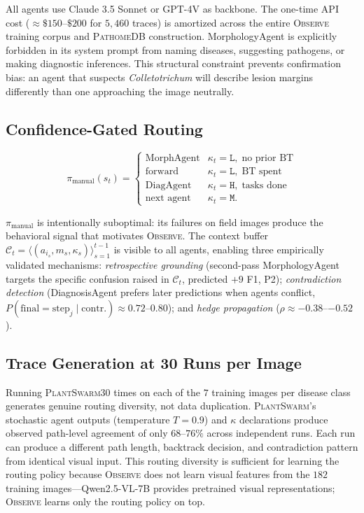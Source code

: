 \documentclass[11pt,twocolumn]{article}
\newcommand{\observe}{\textsc{Observe}\xspace}
\newcommand{\plantswarm}{\textsc{PlantSwarm}\xspace}
\newcommand{\pathomedb}{\textsc{PathomeDB}\xspace}
\newcommand{\kH}{\texttt{H}\xspace}
\newcommand{\kM}{\texttt{M}\xspace}
\newcommand{\kL}{\texttt{L}\xspace}
\begin{document}
All agents use Claude 3.5 Sonnet or GPT-4V as
backbone. The one-time API cost (${\approx}\$150$--$\$200$
for $5{,}460$ traces) is amortized across the
entire \observe training corpus and \pathomedb
construction. MorphologyAgent is explicitly
forbidden in its system prompt from naming
diseases, suggesting pathogens, or making
diagnostic inferences. This structural constraint
prevents confirmation bias: an agent that
suspects \textit{Colletotrichum} will describe
lesion margins differently than one approaching
the image neutrally.

\subsection{Confidence-Gated Routing}

\begin{equation}
\pi_\text{manual}(s_t)=\begin{cases}
\text{MorphAgent} & \kappa_t{=}\kL,\;\text{no prior BT}\\
\text{forward}    & \kappa_t{=}\kL,\;\text{BT spent}\\
\text{DiagAgent}  & \kappa_t{=}\kH,\;\text{tasks done}\\
\text{next agent} & \kappa_t{=}\kM.
\end{cases}
\end{equation}

$\pi_\text{manual}$ is intentionally suboptimal:
its failures on field images produce the behavioral
signal that motivates \observe. The context buffer
$\mathcal{C}_t{=}\langle(a_{i_s}, m_s,
\kappa_s)\rangle_{s=1}^{t-1}$ is visible to all
agents, enabling three empirically validated
mechanisms: \textit{retrospective grounding}
(second-pass MorphologyAgent targets the specific
confusion raised in $\mathcal{C}_t$, predicted
$+9$ F1, P2); \textit{contradiction detection}
(DiagnosisAgent prefers later predictions when
agents conflict, $P(\text{final}{=}\text{step}_j
\mid \text{contr.}) \approx 0.72$--$0.80$);
and \textit{hedge propagation} ($\rho \approx
-0.38$--$-0.52$).

\subsection{Trace Generation at 30 Runs per Image}

Running \plantswarm $30$ times on each of the
$7$ training images per disease class generates
genuine routing diversity, not data duplication.
\plantswarm's stochastic agent outputs (temperature
$T{=}0.9$) and $\kappa$ declarations produce
observed path-level agreement of only $68$--$76\%$
across independent runs. Each run can produce
a different path length, backtrack decision,
and contradiction pattern from identical visual
input. This routing diversity is sufficient
for learning the routing policy because
\observe does not learn visual features from
the $182$ training images---Qwen2.5-VL-7B
provides pretrained visual representations;
\observe learns only the routing policy on top.
\end{document}
